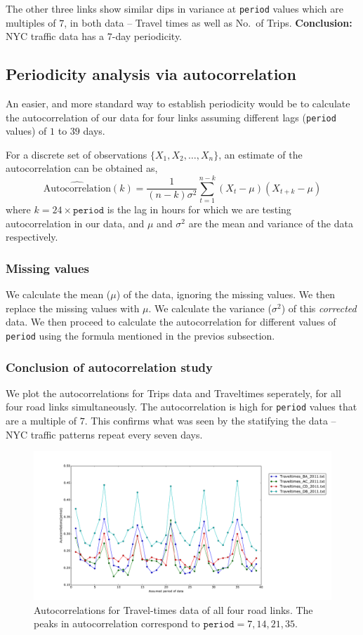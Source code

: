\documentclass[10pt,a4paper]{amsart}
\begin{document}
The other three links show similar dips in variance at \texttt{period} values
which are multiples of \(7\), in both data -- Travel times as well as No.\ of
Trips. \textbf{Conclusion:} NYC traffic data has a \(7\)-day periodicity.

\subsection{Periodicity analysis via autocorrelation}
An easier, and more standard way to establish periodicity would be to
calculate the autocorrelation of our data for four links assuming different
lags (\texttt{period} values) of \(1\) to \(39\) days.

For a discrete set of observations \(\{X_1, X_2, \ldots, X_n\}\), an estimate
of the autocorrelation can be obtained as,
	\[\widehat{\mbox{Autocorrelation}}(k) = \frac{1}{(n-k)\sigma^2}
		\sum_{t=1}^{n-k}(X_t-\mu)(X_{t+k}-\mu)\]
where \(k=24\times\mathtt{period}\) is the lag in hours for which we are
testing autocorrelation in our data, and \(\mu\) and \(\sigma^2\) are the mean
and variance of the data respectively.

\subsubsection{Missing values}
We calculate the mean (\(\mu\)) of the data, ignoring the missing values. We
then replace the missing values with \(\mu\). We calculate the variance
(\(\sigma^2\)) of this \emph{corrected} data.
We then proceed to calculate the autocorrelation for different values of
\texttt{period} using the formula mentioned in the previos subsection.

\subsubsection{Conclusion of autocorrelation study}
We plot the autocorrelations for Trips data and Traveltimes seperately, for
all four road links simultaneously. The autocorrelation is high for
\texttt{period} values that are a multiple of \(7\). This confirms what was
seen by the statifying the data -- NYC traffic patterns repeat every seven
days.

\begin{figure}[h!]
\centering
\includegraphics[scale=0.35]{Figures/Autocorrelation_Traveltimes.pdf}
\caption{Autocorrelations for Travel-times data of all four road links. The
peaks in
autocorrelation correspond to \(\mathtt{period}=7,14,21,35\).}
\end{figure}
\end{document}
